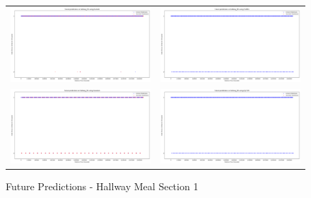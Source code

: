 \begin{figure}
  \begin{tabular}{cc}
    {\includegraphics[width = 3in]{images/results/Future_hallway_M1_Duckett.png}} &
    {\includegraphics[width = 3in]{images/results/Future_hallway_M1_FreMEn.png}} \\
    {\includegraphics[width = 3in]{images/results/Future_hallway_M1_Gaussian.png}} &
    {\includegraphics[width = 3in]{images/results/Future_hallway_M1_HyT-EM.png}} \\
  \end{tabular}
  \caption{Future Predictions - Hallway Meal Section 1}
\end{figure}\\ \\

